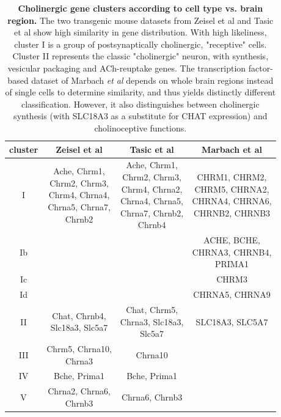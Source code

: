 \begin{table}[ht]
\sffamily
\small
\centering
\begin{tabular}{c | c | c | c}
cluster & Zeisel et al & Tasic et al & Marbach et al \\
\hline
\hline
I & \makecell{Ache, Chrm1, \\Chrm2, Chrm3, \\Chrm4, Chrna4, \\Chrna5, Chrna7, \\Chrnb2} & \makecell{Ache, Chrm1, \\Chrm2, Chrm3, \\Chrm4, Chrna2, \\Chrna4, Chrna5, \\Chrna7, Chrnb2, \\Chrnb4} & \makecell{CHRM1, CHRM2, \\CHRM5, CHRNA2, \\CHRNA4, CHRNA6, \\CHRNB2, CHRNB3} \\ \hline
Ib&  &  & \makecell{ACHE, BCHE, \\CHRNA3, CHRNB4, \\PRIMA1} \\ \hline
Ic& &  & CHRM3 \\ \hline
Id&  &  & CHRNA5, CHRNA9 \\ \hline
II& \makecell{Chat, Chrnb4, \\Slc18a3, Slc5a7} & \makecell{Chat, Chrm5, \\Chrna3, Slc18a3, \\Slc5a7} & SLC18A3, SLC5A7 \\ \hline
III& \makecell{Chrm5, Chrna10, \\Chrna3} & Chrna10 &  \\ \hline
IV&Bche, Prima1 & Bche, Prima1 &  \\ \hline
V& \makecell{Chrna2, Chrna6, \\Chrnb3} & Chrna6, Chrnb3 &  \\
\end{tabular}
\caption{\textbf{Cholinergic gene clusters according to cell type vs. brain region.} The two transgenic mouse datasets from Zeisel et al and Tasic et al show high similarity in gene distribution. With high likeliness, cluster I is a group of postsynaptically cholinergic, "receptive" cells. Cluster II represents the classic "cholinergic" neuron, with synthesis, vesicular packaging and ACh-reuptake genes. The transcription factor-based dataset of Marbach \emph{et al} depends on whole brain regions instead of single cells to determine similarity, and thus yields distinctly different classification. However, it also distinguishes between cholinergic synthesis (with SLC18A3 as a substitute for CHAT expression) and cholinoceptive functions.}
\label{tab:chol-clusters}
\end{table}

